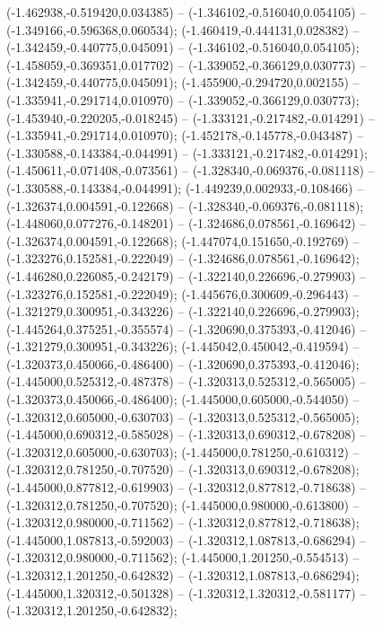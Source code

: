  (-1.462938,-0.519420,0.034385) -- (-1.346102,-0.516040,0.054105) -- (-1.349166,-0.596368,0.060534);
 (-1.460419,-0.444131,0.028382) -- (-1.342459,-0.440775,0.045091) -- (-1.346102,-0.516040,0.054105);
 (-1.458059,-0.369351,0.017702) -- (-1.339052,-0.366129,0.030773) -- (-1.342459,-0.440775,0.045091);
 (-1.455900,-0.294720,0.002155) -- (-1.335941,-0.291714,0.010970) -- (-1.339052,-0.366129,0.030773);
 (-1.453940,-0.220205,-0.018245) -- (-1.333121,-0.217482,-0.014291) -- (-1.335941,-0.291714,0.010970);
 (-1.452178,-0.145778,-0.043487) -- (-1.330588,-0.143384,-0.044991) -- (-1.333121,-0.217482,-0.014291);
 (-1.450611,-0.071408,-0.073561) -- (-1.328340,-0.069376,-0.081118) -- (-1.330588,-0.143384,-0.044991);
 (-1.449239,0.002933,-0.108466) -- (-1.326374,0.004591,-0.122668) -- (-1.328340,-0.069376,-0.081118);
 (-1.448060,0.077276,-0.148201) -- (-1.324686,0.078561,-0.169642) -- (-1.326374,0.004591,-0.122668);
 (-1.447074,0.151650,-0.192769) -- (-1.323276,0.152581,-0.222049) -- (-1.324686,0.078561,-0.169642);
 (-1.446280,0.226085,-0.242179) -- (-1.322140,0.226696,-0.279903) -- (-1.323276,0.152581,-0.222049);
 (-1.445676,0.300609,-0.296443) -- (-1.321279,0.300951,-0.343226) -- (-1.322140,0.226696,-0.279903);
 (-1.445264,0.375251,-0.355574) -- (-1.320690,0.375393,-0.412046) -- (-1.321279,0.300951,-0.343226);
 (-1.445042,0.450042,-0.419594) -- (-1.320373,0.450066,-0.486400) -- (-1.320690,0.375393,-0.412046);
 (-1.445000,0.525312,-0.487378) -- (-1.320313,0.525312,-0.565005) -- (-1.320373,0.450066,-0.486400);
 (-1.445000,0.605000,-0.544050) -- (-1.320312,0.605000,-0.630703) -- (-1.320313,0.525312,-0.565005);
 (-1.445000,0.690312,-0.585028) -- (-1.320313,0.690312,-0.678208) -- (-1.320312,0.605000,-0.630703);
 (-1.445000,0.781250,-0.610312) -- (-1.320312,0.781250,-0.707520) -- (-1.320313,0.690312,-0.678208);
 (-1.445000,0.877812,-0.619903) -- (-1.320312,0.877812,-0.718638) -- (-1.320312,0.781250,-0.707520);
 (-1.445000,0.980000,-0.613800) -- (-1.320312,0.980000,-0.711562) -- (-1.320312,0.877812,-0.718638);
 (-1.445000,1.087813,-0.592003) -- (-1.320312,1.087813,-0.686294) -- (-1.320312,0.980000,-0.711562);
 (-1.445000,1.201250,-0.554513) -- (-1.320312,1.201250,-0.642832) -- (-1.320312,1.087813,-0.686294);
 (-1.445000,1.320312,-0.501328) -- (-1.320312,1.320312,-0.581177) -- (-1.320312,1.201250,-0.642832);
